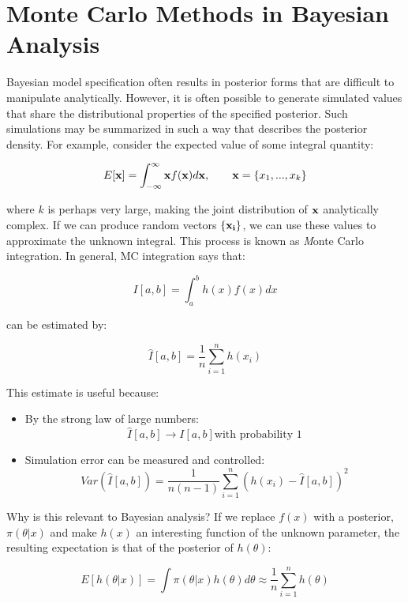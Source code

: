 
\hypertarget{monte-carlo-methods-in-bayesian-analysis}{}

\section*{Monte Carlo Methods in Bayesian Analysis}

Bayesian model specification often results in posterior forms that are difficult to manipulate analytically. However, it is often possible to generate simulated values that share the distributional properties of the specified posterior. Such simulations may be summarized in such a way that describes the posterior density. For example, consider the expected value of some integral quantity:

\[
E[{\bf x}] = \int_{-\infty}^{\infty} {\bf x} f({\bf x}) d{\bf x}, \qquad
{\bf x} = \{x_1,...,x_k\}
\]

\noindent where $k$ is perhaps very large, making the joint distribution of ${\bf x}$ analytically complex. If we can produce random vectors $\{{\bf x_i}\}$, we can use these values to approximate the unknown integral. This process is known as {\emph Monte Carlo integration}. In general, MC integration says that:

\[
I[a,b] = \int_a^b h(x) f(x) dx
\]

\noindent can be estimated by:

\[
\hat{I}[a,b] = \frac{1}{n}\sum_{i=1}^n h(x_i)
\]

\noindent This estimate is useful because:

\begin{itemize}
\item
By the strong law of large numbers:
\[\hat{I}[a,b] \rightarrow I[a,b] \mbox{with probability 1}\]
\item
Simulation error can be measured and controlled:
\[Var(\hat{I}[a,b]) = \frac{1}{n(n-1)}\sum_{i=1}^n (h(x_i)-\hat{I}[a,b])^2\]
\end{itemize}

Why is this relevant to Bayesian analysis? If we replace $f(x)$ with a posterior, $\pi(\theta|x)$ and make $h(x)$ an interesting function of the unknown parameter, the resulting expectation is that of the posterior of $h(\theta)$:

\[
E[h(\theta|x)] = \int \pi(\theta|x) h(\theta) d\theta \approx \frac{1}{n}\sum_{i=1}^n h(\theta)
\]

